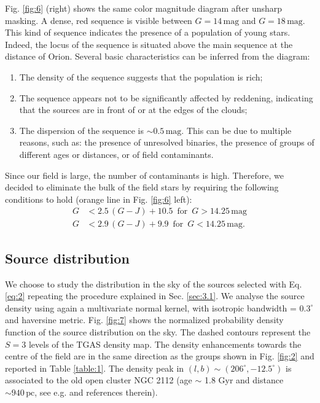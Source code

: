 \documentclass[twocolumn]{aa}
\begin{document}
Fig. \ref{fig:6} (right) shows the same color magnitude diagram after unsharp masking. A dense, red sequence is visible between $G = 14 \, \mathrm{mag}$ and $G = 18 \, \mathrm{mag}$. This kind of sequence \citep[also reported for example by][]{Alves2012} indicates the presence of a population of young stars. Indeed, the locus of the sequence is situated above the main sequence at the distance of Orion. 
Several basic characteristics can be inferred from the diagram: 
\begin{enumerate}
\item The density of the sequence suggests that the population is rich;
\item The sequence appears not to be significantly affected by reddening, indicating that the sources are in front of or at the edges of the clouds;
\item The dispersion of the sequence is $\sim 0.5 \,\mathrm{mag}$.
This can be due to multiple reasons, such as: the presence of unresolved binaries, the presence of groups of different ages or distances, or of field contaminants.
\end{enumerate}
Since our field is large, the number of contaminants is high. Therefore, we decided to eliminate the bulk of the field stars by requiring the following conditions to hold (orange line in Fig. \ref{fig:6} left):
\begin{align}\label{eq:2}
G &< 2.5\,(G-J) + 10.5 \,\,\, \mathrm{for} \,\,\, G > 14.25 \, \mathrm{mag}\nonumber \\ 
G &< 2.9\,(G-J) + 9.9 \,\,\, \mathrm{for} \,\,\, G < 14.25	 \, \mathrm{mag}.
\end{align}



\subsection{Source distribution}\label{sec:3.3}
We choose to study the distribution in the sky of the sources selected with Eq. \eqref{eq:2} repeating the procedure explained in Sec. \ref{sec:3.1}. 
We analyse the source density using again a multivariate normal kernel, with isotropic  bandwidth =  $0.3^{\circ}$ and haversine metric.
Fig. \ref{fig:7} shows the normalized probability density function of the source distribution on the sky. The dashed contours represent the $S = 3$ levels of the TGAS density map. The density enhancements towards the centre of the field  are in the same direction as the groups shown in Fig. \ref{fig:2} and reported in Table \ref{table:1}. 
The density peak in $(l, b) \sim (206^{\circ}, -12.5^{\circ})$ is associated to the old open cluster NGC 2112 (age $\sim$ 1.8 Gyr and distance $\sim 940 \, \mathrm{pc}$, see e.g. \citet{Carraro2008} and references therein).
\end{document}
